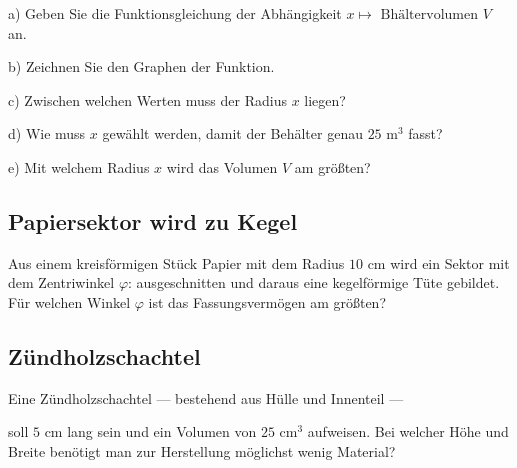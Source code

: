 
a) 
Geben Sie die Funktionsgleichung der Abhängigkeit $x \mapsto \text{ Bhältervolumen } V$ an.

b)
Zeichnen Sie den Graphen der Funktion.

c)
Zwischen welchen Werten muss der Radius $x$ liegen?

d)
Wie muss $x$ gewählt werden, damit der Behälter genau $25 \text{ m}^3$
fasst?

e)
Mit welchem Radius $x$ wird das Volumen $V$ am größten?



\subsection{Papiersektor wird zu Kegel}

Aus einem kreisförmigen Stück Papier mit dem Radius  $10 \text{ cm}$ wird ein Sektor mit dem Zentriwinkel $\varphi$: ausgeschnitten und daraus eine kegelförmige Tüte gebildet. Für welchen Winkel $\varphi$ ist das Fassungsvermögen am größten?





\subsection{Zündholzschachtel}
Eine Zündholzschachtel --- bestehend aus Hülle und Innenteil ---

soll $5 \text{ cm}$ lang sein  und ein Volumen von $25 \text{ cm}^3$ aufweisen. Bei welcher Höhe und Breite benötigt man zur Herstellung möglichst wenig Material?

